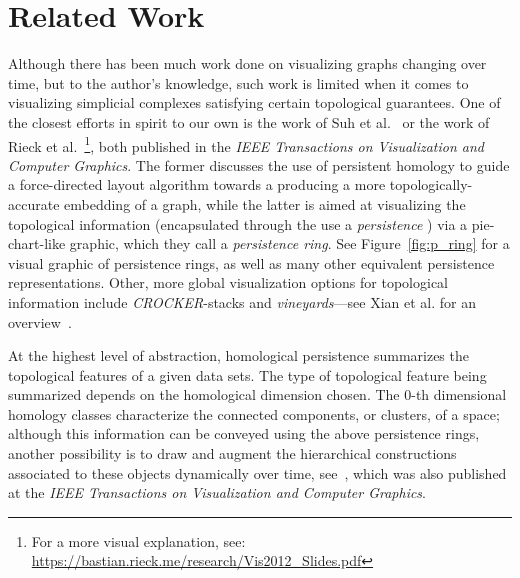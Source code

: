 \documentclass{vgtc}                          %
\begin{document}
\section{Related Work}
Although there has been much work done on visualizing graphs changing over time, but to the author's knowledge, such work is limited when it comes to visualizing simplicial complexes satisfying certain topological guarantees. One of the closest efforts in spirit to our own is the work of Suh et al.~\cite{suh2019persistent} or the work of Rieck et al.~\cite{rieck2012multivariate}\footnote{For a more visual explanation, see: \url{https://bastian.rieck.me/research/Vis2012_Slides.pdf}}, both published in the \emph{IEEE Transactions on Visualization and Computer Graphics}. The former discusses the use of persistent homology to guide a force-directed layout algorithm towards a producing a more topologically-accurate embedding of a graph, while the latter is aimed at visualizing the topological information (encapsulated through the use a \emph{persistence }) via a pie-chart-like graphic, which they call a \emph{persistence ring}. See Figure~\ref{fig:p_ring} for a visual graphic of persistence rings, as well as many other equivalent persistence representations. Other, more global visualization options for topological information include \emph{CROCKER}-stacks and \emph{vineyards}---see Xian et al. for an overview~\cite{xian2020capturing}. 

At the highest level of abstraction, homological persistence summarizes the topological features of a given data sets. The type of topological feature being summarized depends on the homological dimension chosen. The $0$-th dimensional homology classes characterize the connected components, or clusters, of a space; although this information can be conveyed using the above persistence rings, another possibility is to draw and augment the hierarchical constructions associated to these objects dynamically over time, see~\cite{oesterling2011visualization}, which was also published at the \emph{IEEE Transactions on Visualization and Computer Graphics}. 
\end{document}

